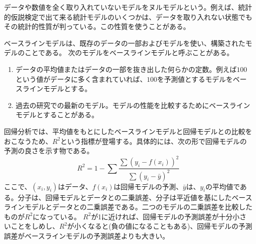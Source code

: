 データや数値を全く取り入れていないモデルをヌルモデルという。例えば、統計的仮説検定で出て来る統計モデルのいくつかは、データを取り入れない状態でもその統計的性質が判っている。この性質を使うことがある。


ベースラインモデルは、既存のデータの一部およびモデルを使い、構築されたモデルのことである。
次のモデルをベースラインモデルと呼ぶことがある。
\begin{enumerate}
 \item データの平均値またはデータの一部を抜き出した何らかの定数。例えば$100$という値がデータに多く含まれていれば、$100$を予測値とするモデルをベースラインモデルとする。
 \item 過去の研究での最新のモデル。モデルの性能を比較するためにベースラインモデルとすることがある。
\end{enumerate}

回帰分析では、平均値をもとにしたベースラインモデルと回帰モデルとの比較をおこなうため、$R^2$という指標が登場する。具体的には、次の形で回帰モデルの予測の良さを示す物である。
\begin{equation}
R^2 = 1- \sum\frac{\sum (y_i-f(x_i))^2}{\sum (y_i-\bar{y})^2}
\end{equation}
ここで、$(x_i,y_i)$はデータ、$f(x_i)$は回帰モデルの予測、$\bar{y}$は、$y_i$の平均値である。分子は、回帰モデルとデータとの二乗誤差、分子は平近値を基にしたベースラインモデルとデータとの二乗誤差である。二つのモデルの二乗誤差を比較したものが$R^2$になっている。
$R^2$が1に近ければ、回帰モデルの予測誤差が十分小さいことをしめし、$R^2$が小くなると(負の値になることもある)、回帰モデルの予測誤差がベースラインモデルの予測誤差よりも大きい。


